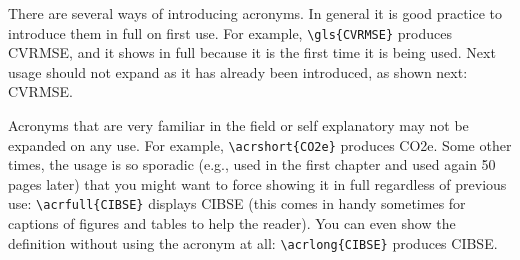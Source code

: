There are several ways of introducing acronyms. 
In general it is good practice to introduce them in full on first use. 
For example, \verb|\gls{CVRMSE}| produces \gls{CVRMSE}, and it shows in full because 
it is the first time it is being used.
Next usage should not expand as it has already been introduced, as shown next: \gls{CVRMSE}.

Acronyms that are very familiar in the field or self explanatory may not be expanded on any use.
For example, \verb|\acrshort{CO2e}| produces \acrshort{CO2e}.
Some other times, the usage is so sporadic 
(e.g., used in the first chapter and used again 50 pages later)
that you might want to force showing it in full regardless of previous use: 
\verb|\acrfull{CIBSE}| displays \acrfull{CIBSE}
(this comes in handy sometimes for captions of figures and tables to help the reader).
You can even show the definition without using the acronym at all: 
\verb|\acrlong{CIBSE}| produces \acrlong{CIBSE}.